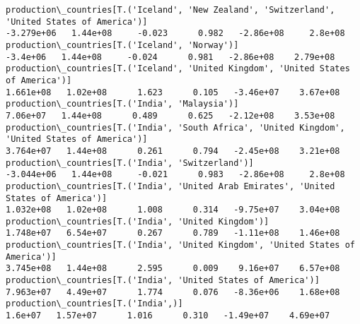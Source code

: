 \documentclass[11pt]{article}
\begin{document}
\begin{Verbatim}[commandchars=\\\{\}]
production\_countries[T.('Iceland', 'New Zealand', 'Switzerland', 'United States of America')]                                                                                         -3.279e+06   1.44e+08     -0.023      0.982   -2.86e+08     2.8e+08
production\_countries[T.('Iceland', 'Norway')]                                                                                                                                           -3.4e+06   1.44e+08     -0.024      0.981   -2.86e+08    2.79e+08
production\_countries[T.('Iceland', 'United Kingdom', 'United States of America')]                                                                                                      1.661e+08   1.02e+08      1.623      0.105   -3.46e+07    3.67e+08
production\_countries[T.('India', 'Malaysia')]                                                                                                                                           7.06e+07   1.44e+08      0.489      0.625   -2.12e+08    3.53e+08
production\_countries[T.('India', 'South Africa', 'United Kingdom', 'United States of America')]                                                                                        3.764e+07   1.44e+08      0.261      0.794   -2.45e+08    3.21e+08
production\_countries[T.('India', 'Switzerland')]                                                                                                                                      -3.044e+06   1.44e+08     -0.021      0.983   -2.86e+08     2.8e+08
production\_countries[T.('India', 'United Arab Emirates', 'United States of America')]                                                                                                  1.032e+08   1.02e+08      1.008      0.314   -9.75e+07    3.04e+08
production\_countries[T.('India', 'United Kingdom')]                                                                                                                                    1.748e+07   6.54e+07      0.267      0.789   -1.11e+08    1.46e+08
production\_countries[T.('India', 'United Kingdom', 'United States of America')]                                                                                                        3.745e+08   1.44e+08      2.595      0.009    9.16e+07    6.57e+08
production\_countries[T.('India', 'United States of America')]                                                                                                                          7.963e+07   4.49e+07      1.774      0.076   -8.36e+06    1.68e+08
production\_countries[T.('India',)]                                                                                                                                                       1.6e+07   1.57e+07      1.016      0.310   -1.49e+07    4.69e+07

\end{Verbatim}
\end{document}
